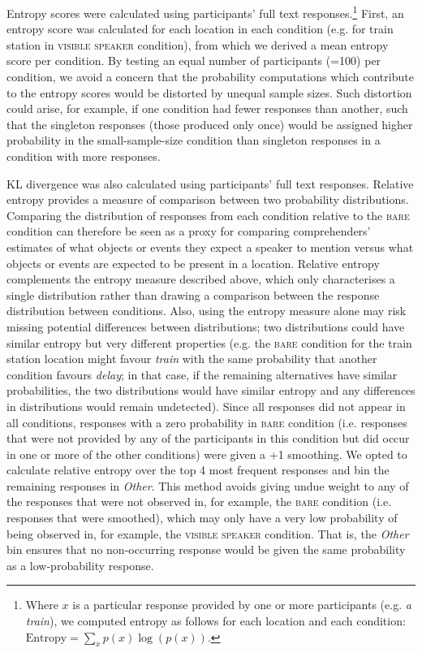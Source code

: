 \documentclass[output=paper,colorlinks,citecolor=brown]{langscibook}
\begin{document}
Entropy scores were calculated using participants' full text responses.\footnote{Where $x$ is a particular response provided by one or more participants (e.g. \textit{a train}), we computed entropy as follows for each location and each condition: $\text{Entropy} = \sum_{x} p(x) \log (p(x))$.} First, an entropy score was calculated for each location in each condition (e.g. for train station in \textsc{visible speaker} condition), from which we derived a mean entropy score per condition. By testing an equal number of participants (=100) per condition, we avoid a concern that the probability computations which contribute to the entropy scores would be distorted by unequal sample sizes. Such distortion could arise, for example, if one condition had fewer responses than another, such that the singleton responses (those produced only once) would be assigned higher probability in the small-sample-size condition than singleton responses in a condition with more responses.
 
KL divergence was also calculated using participants' full text responses. Relative entropy provides a measure of comparison between two probability distributions. Comparing the distribution of responses from  each condition relative to the \textsc{bare} condition can therefore be seen as a proxy for comparing comprehenders’ estimates of what objects or events they expect a speaker to mention versus what objects or events are expected to be present in a location. Relative entropy complements the entropy measure described above, which only characterises a single distribution rather than drawing a comparison between the response distribution between conditions. Also, using the entropy measure alone may risk missing potential differences between distributions; two distributions could have similar entropy but very different properties (e.g. the {\textsc{bare}} condition for the train station location might favour \textit{train} with the same probability that another condition favours \textit{delay}; in that case, if the remaining alternatives have similar probabilities, the two distributions would have similar entropy and any differences in distributions would remain undetected). Since all responses did not appear in all conditions, responses with a zero probability in {\textsc{bare}} condition (i.e. responses that were not provided by any of the participants in this condition but did occur in one or more of the other conditions) were given a +1 smoothing. We opted to calculate relative entropy over the top 4 most frequent responses and bin the remaining responses in \textit{Other}. This method avoids giving undue weight to any of the responses that were not observed in, for example, the \textsc{bare} condition (i.e. responses that were smoothed), which may only have a very low probability of being observed in, for example, the \textsc{visible speaker} condition. That is, the \textit{Other} bin ensures that no non-occurring response would be given the same probability as a low-probability response.
\end{document}
